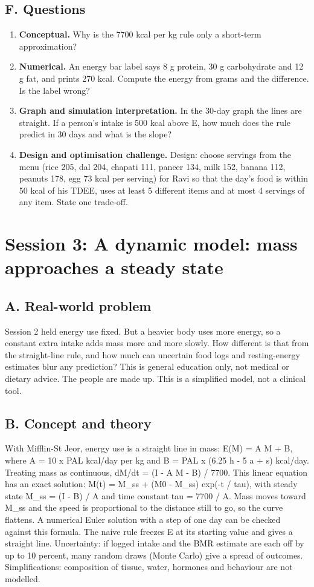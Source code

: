 \documentclass[11pt,a4paper]{article}
\begin{document}
\subsection*{F. Questions}
\begin{enumerate}[nosep]
\item \textbf{Conceptual.} Why is the 7700 kcal per kg rule only a short-term approximation?
\item \textbf{Numerical.} An energy bar label says 8 g protein, 30 g carbohydrate and 12 g fat, and prints 270 kcal. Compute the energy from grams and the difference. Is the label wrong?
\item \textbf{Graph and simulation interpretation.} In the 30-day graph the lines are straight. If a person's intake is 500 kcal above E, how much does the rule predict in 30 days and what is the slope?
\item \textbf{Design and optimisation challenge.} Design: choose servings from the menu (rice 205, dal 204, chapati 111, paneer 134, milk 152, banana 112, peanuts 178, egg 73 kcal per serving) for Ravi so that the day's food is within 50 kcal of his TDEE, uses at least 5 different items and at most 4 servings of any item. State one trade-off.
\end{enumerate}

\section{Session 3: A dynamic model: mass approaches a steady state}

\subsection*{A. Real-world problem}
Session 2 held energy use fixed. But a heavier body uses more energy, so a constant extra intake adds mass more and more slowly. How different is that from the straight-line rule, and how much can uncertain food logs and resting-energy estimates blur any prediction? This is general education only, not medical or dietary advice. The people are made up. This is a simplified model, not a clinical tool.

\subsection*{B. Concept and theory}
With Mifflin-St Jeor, energy use is a straight line in mass: E(M) = A M + B, where A = 10 x PAL kcal/day per kg and B = PAL x (6.25 h - 5 a + s) kcal/day. Treating mass as continuous, dM/dt = (I - A M - B) / 7700. This linear equation has an exact solution: M(t) = M\_ss + (M0 - M\_ss) exp(-t / tau), with steady state M\_ss = (I - B) / A and time constant tau = 7700 / A. Mass moves toward M\_ss and the speed is proportional to the distance still to go, so the curve flattens. A numerical Euler solution with a step of one day can be checked against this formula. The naive rule freezes E at its starting value and gives a straight line. Uncertainty: if logged intake and the BMR estimate are each off by up to 10 percent, many random draws (Monte Carlo) give a spread of outcomes. Simplifications: composition of tissue, water, hormones and behaviour are not modelled.
\end{document}
